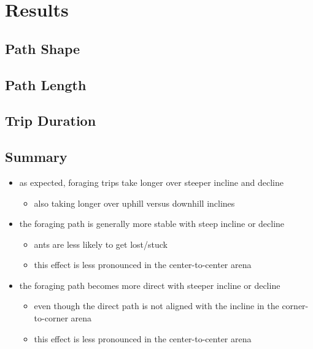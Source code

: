 \section{Results}

\subsection{Path Shape}
\FloatBarrier


\subsection{Path Length}
\FloatBarrier


\subsection{Trip Duration}
\FloatBarrier


\subsection{Summary}
\begin{itemize}
	\item as expected, foraging trips take longer over steeper incline and decline
	\begin{itemize}
		\item also taking longer over uphill versus downhill inclines
	\end{itemize}
	\vspace{1em}

	\item the foraging path is generally more stable with steep incline or decline
	\begin{itemize}
		\item ants are less likely to get lost/stuck
		\item this effect is less pronounced in the center-to-center arena
	\end{itemize}
	\vspace{1em}

	\item the foraging path becomes more direct with steeper incline or decline
	\vspace{-1em}
	\begin{itemize}
		\item even though the direct path is not aligned with the incline in the corner-to-corner arena
		\item this effect is less pronounced in the center-to-center arena
	\end{itemize}
\end{itemize}
